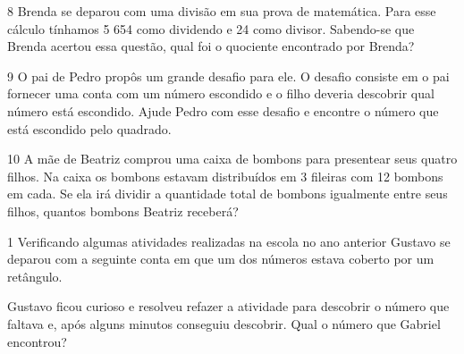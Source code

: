 

\num{8} Brenda se deparou com uma divisão em sua prova de matemática. Para
esse cálculo tínhamos 5 654 como dividendo e 24 como divisor. Sabendo-se
que Brenda acertou essa questão, qual foi o quociente encontrado por
Brenda?



\num{9} O pai de Pedro propôs um grande desafio para ele. O desafio
consiste em o pai fornecer uma conta com um número escondido e o filho
deveria descobrir qual número está escondido. Ajude Pedro com esse
desafio e encontre o número que está escondido pelo quadrado.



\num{10} A mãe de Beatriz comprou uma caixa de bombons para presentear seus
quatro filhos. Na caixa os bombons estavam distribuídos em 3 fileiras
com 12 bombons em cada. Se ela irá dividir a quantidade total de bombons
igualmente entre seus filhos, quantos bombons Beatriz receberá?




\num{1} Verificando algumas atividades realizadas na escola no ano anterior
Gustavo se deparou com a seguinte conta em que um dos números estava
coberto por um retângulo.


Gustavo ficou curioso e resolveu refazer a atividade para descobrir o
número que faltava e, após alguns minutos conseguiu descobrir. Qual o
número que Gabriel encontrou?

